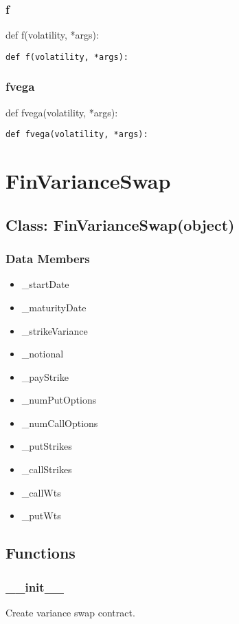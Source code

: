 \documentclass[twoside,11pt]{book}
\begin{document}
\subsubsection*{{\bf f}}
def f(volatility, *args): 

\begin{lstlisting}
def f(volatility, *args):
\end{lstlisting}

\subsubsection*{{\bf fvega}}
def fvega(volatility, *args): 

\begin{lstlisting}
def fvega(volatility, *args):
\end{lstlisting}

\newpage
\section{FinVarianceSwap}

\subsection*{Class: FinVarianceSwap(object)}


\subsubsection*{Data Members}
\begin{itemize}
\item{\_startDate}
\item{\_maturityDate}
\item{\_strikeVariance}
\item{\_notional}
\item{\_payStrike}
\item{\_numPutOptions}
\item{\_numCallOptions}
\item{\_putStrikes}
\item{\_callStrikes}
\item{\_callWts}
\item{\_putWts}
\end{itemize}

\subsection*{Functions}

\subsubsection*{{\bf \_\_init\_\_}}
Create variance swap contract.  
\end{document}
